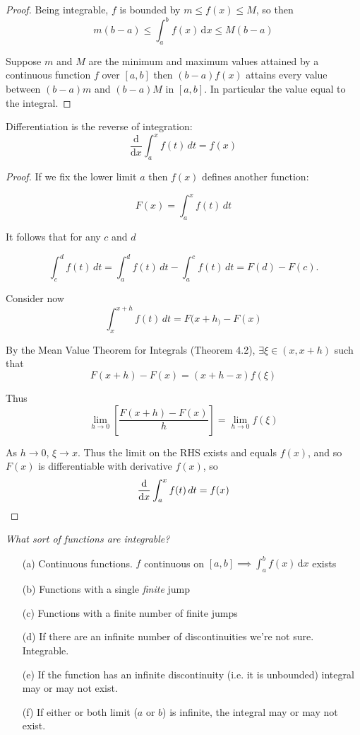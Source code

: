 \documentclass[10pt]{scrartcl}
\begin{document}
\begin{proof}
Being integrable, $f$ is bounded by $m \leq f(x) \leq M$, so then 
\[m(b-a) \leq \int_a^b f(x)\,\mathrm{d}x \leq M(b-a)\]

Suppose $m$ and $M$ are the minimum and maximum values attained by a continuous function $f$ over $[a,b]$ then $(b-a)f(x)$ attains every value between $(b-a)m$ and $(b-a)M$ in $[a,b]$. In particular the value equal to the integral.
\end{proof}



\begin{theorem}
Differentiation is the reverse of integration:
	\[\frac{\mathrm{d}}{\mathrm{d}x}\int_a^x f(t)\, dt = f(x)\]
\end{theorem}
\begin{proof}
If we fix the lower limit $a$ then $f(x)$ defines another function:

\[F(x) = \int_a^x f(t)\,dt\]

It follows that for any $c$ and $d$

\[\int_c^d f(t)\,dt = \int_a^d f(t)\,dt - \int_a^c f(t)\,dt = F(d) - F(c).\]

Consider now 
\[\int_x^{x+h} f(t)\,dt = F(x+h_) - F(x)\]

By the Mean Value Theorem for Integrals (Theorem 4.2), $\exists \xi \in (x,x+h)$ such that
\[F(x+h) - F(x) = (x+h-x)f(\xi)\]

Thus
\[\lim_{h \to 0}\left[\frac{F(x+h) - F(x)}{h}\right] = \lim_{h \to 0}f(\xi)\]

As $h \to 0$, $\xi \to x$. Thus the limit on the RHS exists and equals $f(x)$, and so $F(x)$ is differentiable with derivative $f(x)$, so
\[\frac{\mathrm{d}}{\mathrm{d}x}\int_a^x f(t)\, dt = f(x)\qedhere\]
\end{proof}


\emph{What sort of functions are integrable?} 

\begin{itemize}
  \item[(a)] Continuous functions. $f$ continuous on $[a,b] \implies \int_a^b f(x)\, \mathrm{d}x$ exists
  \item[(b)] Functions with a single \emph{finite} jump
  \item[(c)] Functions with a finite number of finite jumps
  \item[(d)] If there are an infinite number of discontinuities we're not sure. Integrable.
  \item[(e)] If the function has an infinite discontinuity (i.e. it is unbounded) integral may or may not exist.
  \item[(f)] If either or both limit ($a$ or $b$) is infinite, the integral may or may not exist. 
\end{itemize}
\end{document}
